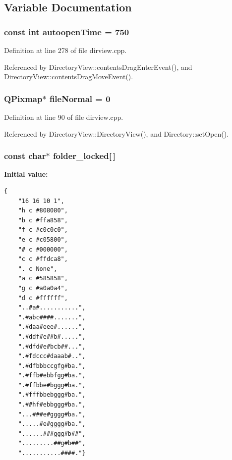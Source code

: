 \subsection{Variable Documentation}
\subsubsection{\setlength{\rightskip}{0pt plus 5cm}const int {\bf autoopen\-Time} = 750\hspace{0.3cm}{\tt  [static]}}\label{dirview_8cpp_a6}




Definition at line 278 of file dirview.cpp.

Referenced by Directory\-View::contents\-Drag\-Enter\-Event(), and Directory\-View::contents\-Drag\-Move\-Event().
\subsubsection{\setlength{\rightskip}{0pt plus 5cm}QPixmap$\ast$ {\bf file\-Normal} = 0}\label{dirview_8cpp_a5}




Definition at line 90 of file dirview.cpp.

Referenced by Directory\-View::Directory\-View(), and Directory::set\-Open().
\subsubsection{\setlength{\rightskip}{0pt plus 5cm}const char$\ast$ {\bf folder\_\-locked}[$\,$]\hspace{0.3cm}{\tt  [static]}}\label{dirview_8cpp_a0}


{\bf Initial value:}

\footnotesize\begin{verbatim}{
    "16 16 10 1",
    "h c #808080",
    "b c #ffa858",
    "f c #c0c0c0",
    "e c #c05800",
    "# c #000000",
    "c c #ffdca8",
    ". c None",
    "a c #585858",
    "g c #a0a0a4",
    "d c #ffffff",
    "..#a#...........",
    ".#abc####.......",
    ".#daa#eee#......",
    ".#ddf#e##b#.....",
    ".#dfd#e#bcb##...",
    ".#fdccc#daaab#..",
    ".#dfbbbccgfg#ba.",
    ".#ffb#ebbfgg#ba.",
    ".#ffbbe#bggg#ba.",
    ".#fffbbebggg#ba.",
    ".##hf#ebbggg#ba.",
    "...###e#gggg#ba.",
    ".....#e#gggg#ba.",
    "......###ggg#b##",
    ".........##g#b##",
    "...........####."}
\end{verbatim}\normalsize 



